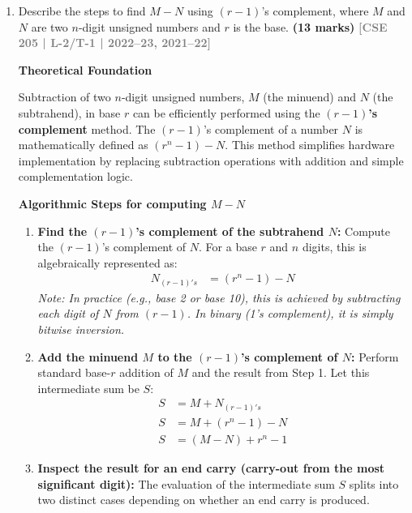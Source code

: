 \documentclass[12pt,a3paper]{article}
\newcommand{\yr}[1]{\hfill\textcolor{gray}{\small\textbf{[#1]}}}
\newcommand{\mk}[1]{\textcolor{orange!70!black}{\small\textbf{(#1 marks)}}}
\begin{document}
\begin{enumerate}

\item Describe the steps to find $M - N$ using $(r-1)$'s complement, where $M$ and $N$ are two $n$-digit unsigned numbers and $r$ is the base.
\mk{13} \yr{CSE 205 | L-2/T-1 | 2022--23, 2021--22}

\begin{tcolorbox}[enhanced,breakable,ansbox,colback=cD!4,colframe=cD,boxrule=0.8pt,arc=5pt,title={\textbf{Answer}},fonttitle=\bfseries\color{white},colbacktitle=cD]

\textbf{\textcolor{cD}{Theoretical Foundation}}

Subtraction of two $n$-digit unsigned numbers, $M$ (the minuend) and $N$ (the subtrahend), in base $r$ can be efficiently performed using the \textbf{$(r-1)$'s complement} method. The $(r-1)$'s complement of a number $N$ is mathematically defined as $(r^n - 1) - N$. This method simplifies hardware implementation by replacing subtraction operations with addition and simple complementation logic.

\vspace{1em}
\textbf{\textcolor{cD}{Algorithmic Steps for computing $M - N$}}

\begin{enumerate}
    \item \textbf{Find the $(r-1)$'s complement of the subtrahend $N$:}
    Compute the $(r-1)$'s complement of $N$. For a base $r$ and $n$ digits, this is algebraically represented as:
    \begin{align*}
        N_{(r-1)'s} &= (r^n - 1) - N
    \end{align*}
    \textit{Note: In practice (e.g., base 2 or base 10), this is achieved by subtracting each digit of $N$ from $(r-1)$. In binary (1's complement), it is simply bitwise inversion.}

    \item \textbf{Add the minuend $M$ to the $(r-1)$'s complement of $N$:}
    Perform standard base-$r$ addition of $M$ and the result from Step 1. Let this intermediate sum be $S$:
    \begin{align*}
        S &= M + N_{(r-1)'s} \\
        S &= M + (r^n - 1) - N \\
        S &= (M - N) + r^n - 1
    \end{align*}

    \item \textbf{Inspect the result for an end carry (carry-out from the most significant digit):}
    The evaluation of the intermediate sum $S$ splits into two distinct cases depending on whether an end carry is produced.


\end{enumerate}
\end{tcolorbox}
\end{enumerate}
\end{document}

